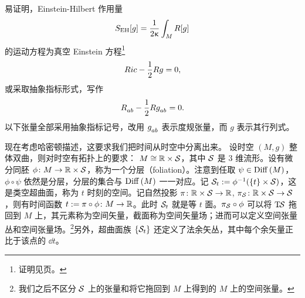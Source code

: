 		易证明，Einstein-Hilbert 作用量
		\begin{equation}
			S_{\text{EH}}[g] = \frac{1}{2\upkappa} \int_M {R}[g] 
		\end{equation}
		的运动方程为真空 Einstein 方程\footnote{证明见\pageref{prf_EEq}页。}%
		\begin{equation}
			Ric - \frac{1}{2} {R} g = 0, \label{eq-EEq}
		\end{equation}
		或采取抽象指标形式，写作
		\begin{equation}
			\tensor{\Ric}{_a_b} - \frac{1}{2} \curR \tensor{g}{_a_b} = 0.
		\end{equation}
		以下张量全部采用抽象指标记号，改用 $\tensor{g}{_a_b}$ 表示度规张量，而 $g$ 表示其行列式。

		现在考虑哈密顿描述，这要求我们把时间从时空中分离出来。%
		设时空 $\left( M, g \right)$ 整体双曲，则对时空有拓扑上的要求： $M \cong \mathbb{R} \times \mathcal{S}$，其中 $\mathcal{S}$ 是 $3$ 维流形\cite{wald1989}。设有微分同胚 $\phi \colon M \rightarrow \mathbb{R} \times \mathcal{S}$，称为一个分层（foliation）。注意到任取 $\psi \in \mathrm{Diff}\left(M\right)$，$\phi \circ \psi$ 依然是分层，分层的集合与 $\mathrm{Diff}\left(M\right)$ 一一对应。记 $\mathcal{S}_t := \phi^{-1}(\left\{ t \right\} \times \mathcal{S})$，这是类空超曲面，称为 $t$ 时刻的空间。记自然投影 $\pi \colon \mathbb{R} \times \mathcal{S} \rightarrow \mathbb{R}$, $\pi_{\mathcal{S}} \colon \mathbb{R} \times \mathcal{S} \rightarrow \mathcal{S}$，则有时间函数 $t := \pi \circ \phi \colon M \rightarrow \mathbb{R}$。此时 $\mathcal{S}_t$ 就是等 $t$ 面。$\pi_{\mathcal{S}} \circ \phi$ 可以将 $\mathrm{T}_{{}}\!{\mathcal{S}}$ 拖回到 $M$ 上，其元素称为空间矢量，截面称为空间矢量场；进而可以定义空间张量丛和空间张量场。\footnote{我们之后不区分 $\mathcal{S}$ 上的张量和将它拖回到 $M$ 上得到的 $M$ 上的空间张量。}另外，超曲面族 $\left\{ \mathcal{S}_t \right\}$ 还定义了法余矢丛，其中每个余矢量正比于该点的 $\dd{t}$。

